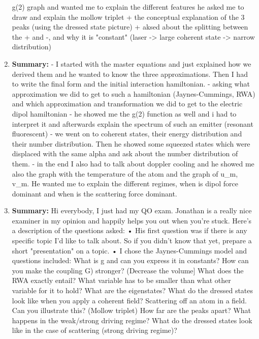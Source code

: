 \documentclass{article}%
\begin{document}
\begin{enumerate}
g(2) graph and wanted me to explain the different features\newline%
he asked me to draw and explain the mollow triplet + the conceptual explanation of the 3 peaks (using the dressed state picture) + aksed about the splitting between the + and {-}, and why it is "constant" (laser {-}> large coherent state {-}> narrow distribution)%
\item%
\begin{mycolorbox}%
\textbf{Summary:}%
\newline%
{-} I started with the master equations and just explained how we derived them and he wanted to know the three approximations. Then I had to write the final form and the initial interaction hamiltonian.\newline%
{-} asking what approximation we did to get to such a hamiltonian (Jaynes{-}Cummings, RWA) and which approximation and transformation we did to get to the electric dipol hamiltonian\newline%
{-} he showed me the g(2) function as well and i had to interpret it and afterwards explain the spectrum of such an emitter (resonant fluorescent)\newline%
{-} we went on to coherent states, their energy distribution and their number distribution. Then he showed some squeezed states which were displaced with the same alpha and ask about the number distribution of them.\newline%
{-} in the end I also had to talk about doppler cooling and he showed me also the graph with the temperature of the atom and the graph of u\_m, v\_m. He wanted me to explain the different regimes, when is dipol force dominant and when is the scattering force dominant.%
\end{mycolorbox}%
\item%
\textbf{Summary:}%
\newline%
Hi everybody, I just had my QO exam. Jonathan is a really nice examiner in my opinion and happily helps you out when you're stuck. Here's a description of the questions asked:\newline%
 • His first question was if there is any specific topic I'd like to talk about. So if you didn't know that yet, prepare a short "presentation" on a topic.\newline%
 • I chose the Jaynes{-}Cummings model and questions included: What is g and can you express it in constants? How can you make the coupling G) stronger? (Decrease the volume{]} What does the RWA exactly entail? What variable has to be smaller than what other variable for it to hold? What are the eigenstates? What do the dressed states look like when you apply a coherent field? Scattering off an atom in a field. Can you illustrate this? (Mollow triplet) How far are the peaks apart? What happens in the weak/strong driving regime? What do the dressed states look like in the case of scattering (strong driving regime)?\newline%

\end{enumerate}
\end{document}
